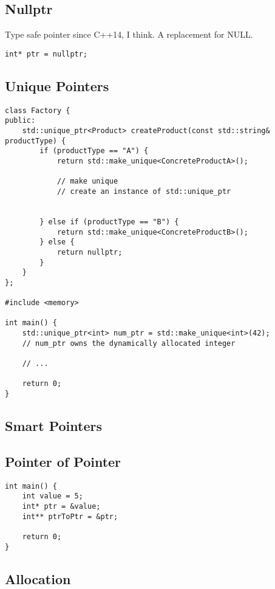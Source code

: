 \subsection{Nullptr}

Type safe pointer since C++14, I think. A replacement for NULL.

\begin{verbatim}
int* ptr = nullptr;
\end{verbatim}


\subsection{Unique Pointers}

\begin{verbatim}
class Factory {
public:
    std::unique_ptr<Product> createProduct(const std::string& productType) {
        if (productType == "A") {
            return std::make_unique<ConcreteProductA>();

            // make unique
            // create an instance of std::unique_ptr


        } else if (productType == "B") {
            return std::make_unique<ConcreteProductB>();
        } else {
            return nullptr;
        }
    }
};

#include <memory>

int main() {
    std::unique_ptr<int> num_ptr = std::make_unique<int>(42);
    // num_ptr owns the dynamically allocated integer

    // ...
    
    return 0;
}

\end{verbatim}

\subsection{Smart Pointers}

\subsection{Pointer of Pointer}

\begin{verbatim}
int main() {
    int value = 5;
    int* ptr = &value;
    int** ptrToPtr = &ptr;

    return 0;
}
\end{verbatim}

\subsection{Allocation}

